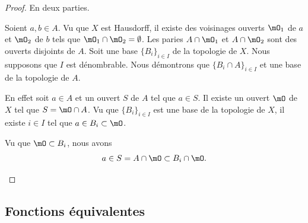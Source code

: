 \begin{proof}
	En deux parties.
	\begin{subproof}
		Soient \( a,b\in A\). Vu que \( X\) est Hausdorff, il existe des voisinages ouverts \( \mO_1\) de \( a\) et \( \mO_2\) de \( b\) tels que \( \mO_1\cap\mO_2=\emptyset\). Les paries \( A\cap\mO_1\) et \( A\cap\mO_2\) sont des ouverts disjoints de \( A\).
		Soit une base \( \{ B_i \}_{i\in I}\) de la topologie de \( X\). Nous supposons que \( I\) est dénombrable. Nous démontrons que \( \{ B_i\cap A \}_{i\in I}\) et une base de la topologie de \( A\).

		En effet soit \( a\in A\) et un ouvert \( S\) de \( A\) tel que \( a\in S\). Il existe un ouvert \( \mO\) de \( X\) tel que \( S=\mO\cap A\). Vu que \( \{ B_i \}_{i\in I}\) est une base de la topologie de \( X\), il existe \( i\in I\) tel que \( a\in B_i\subset\mO\).

		Vu que \( \mO\subset B_i\), nous avons
		\begin{equation}
			a\in S=A\cap\mO\subset B_i\cap\mO.
		\end{equation}
	\end{subproof}
\end{proof}

\subsection{Fonctions équivalentes}

